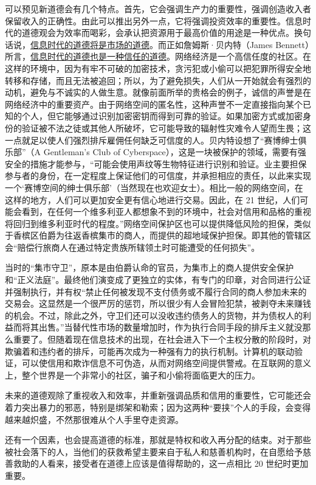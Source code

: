 可以预见新道德会有几个特点。首先，它会强调生产力的重要性，强调创造收入者保留收入的正确性。由此可以推出另外一点，它将强调投资效率的重要性。信息时代的道德观会为效率而喝彩，会承认把资源用于最高价值的用途是一种优点。换句话说，\uline{信息时代的道德将是市场的道德}。而正如詹姆斯·贝内特（James Bennett）所言，\uline{信息时代的道德也是一种信任的道德}。网络经济是一个高信任度的社区。在这样的环境中，因为有牢不可破的加密技术，贪污犯或小偷可以把犯罪所得安全地转移和存储，而且无法被追回；所以，为了避免损失，人们从一开始就会有强烈的动机，避免与不诚实的人做生意。就像前面所举的贵格会的例子，诚信的声誉是在网络经济中的重要资产。由于网络空间的匿名性，这种声誉不一定直接指向某个已知的个人，但它能够通过识别加密密钥而得到可靠的验证。如果加密方式或加密身份的验证被不法之徒或其他人所破坏，它可能导致的辐射性灾难令人望而生畏；这一点就足以使人们强烈排斥雇佣任何缺乏可信度的人。贝内特设想了“赛博绅士俱乐部”（A Gentleman's Club of Cyberspace），这是一块被保护的领域，需要有强安全的措施才能参与，“可能会使用声纹等生物特征进行识别和验证。业主要担保参与者的身份，在一定程度上保证他们的可信度，并承担相应的责任，以此来实现一个‘赛博空间的绅士俱乐部’（当然现在也欢迎女士）。相比一般的网络空间，在这样的地方，人们可以更加安全更有信心地进行交易。因此，在 21 世纪，人们可能会看到，在任何一个维多利亚人都想象不到的环境中，社会对信用和品格的重视将回归到维多利亚时代的程度。”网络空间保护区也可以提供降低风险的担保，类似于香槟区伯爵为往返香槟集市的商人，而提供的超地域保护担保。即其他的管辖区会“赔偿行旅商人在通过特定贵族所辖领土时可能遭受的任何损失”。

当时的“集市守卫”，原本是由伯爵认命的官员，为集市上的商人提供安全保护和“正义法庭”。最终他们演变成了更独立的实体，有专门的印章，对合同进行公证并强制执行，并有权“禁止任何被发现不支付债务或不履行合同的商人参加未来的交易会。这显然是一个很严厉的惩罚，所以很少有人会冒险犯禁，被剥夺未来赚钱的机会。不过，除此之外，守卫们还可以没收违约债务人的货物，并为债权人的利益而将其出售。”当替代性市场的数量增加时，作为执行合同手段的排斥主义就没那么重要了。但随着现在信息技术的出现，在社会进入下一个主权分散的阶段时，对欺骗着和违约者的排斥，可能再次成为一种强有力的执行机制。计算机的联动验证，可以使信用和欺诈信息不可伪造，从而对网络空间提供警戒。在互联网的意义上，整个世界是一个非常小的社区，骗子和小偷将面临更大的压力。

未来的道德观除了重视收入和效率，并重新强调品质和信用的重要性，它可能还会着力突出暴力的邪恶，特别是绑架和勒索；因为这两种“要挟”个人的手段，会变得越来越炽盛，不然那很难从个人手里夺走资源。

还有一个因素，也会提高道德的标准，那就是特权和收入再分配的结束。对于那些被社会落下的人，当他们的获救希望主要来自于私人和慈善机构时，在自愿给予慈善救助的人看来，接受者在道德上应该是值得帮助的，这一点相比 20 世纪时更加重要。

